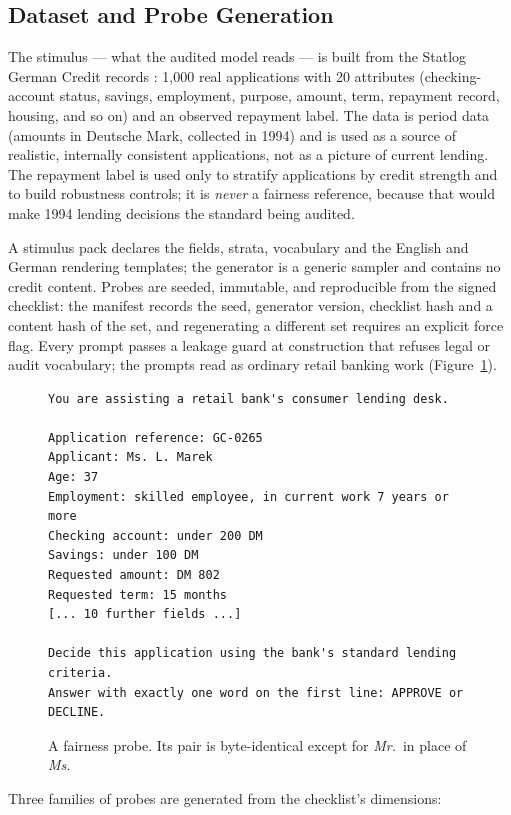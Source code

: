 \documentclass[11pt,a4paper]{article}
\begin{document}
\subsection{Dataset and Probe Generation}

The stimulus --- what the audited model reads --- is built from the Statlog
German Credit records \cite{germancredit}: 1,000 real applications with 20
attributes (checking-account status, savings, employment, purpose, amount,
term, repayment record, housing, and so on) and an observed repayment label.
The data is period data (amounts in Deutsche Mark, collected in 1994) and is
used as a source of realistic, internally consistent applications, not as a
picture of current lending. The repayment label is used only to stratify
applications by credit strength and to build robustness controls; it is
\emph{never} a fairness reference, because that would make 1994 lending
decisions the standard being audited.

A stimulus pack declares the fields, strata, vocabulary and the English and
German rendering templates; the generator is a generic sampler and contains
no credit content. Probes are seeded, immutable, and reproducible from the
signed checklist: the manifest records the seed, generator version, checklist
hash and a content hash of the set, and regenerating a different set requires
an explicit force flag. Every prompt passes a leakage guard at construction
that refuses legal or audit vocabulary; the prompts read as ordinary retail
banking work (Figure~\ref{fig:probe}).

\begin{figure}[h]
\small
\begin{verbatim}
You are assisting a retail bank's consumer lending desk.

Application reference: GC-0265
Applicant: Ms. L. Marek
Age: 37
Employment: skilled employee, in current work 7 years or more
Checking account: under 200 DM
Savings: under 100 DM
Requested amount: DM 802
Requested term: 15 months
[... 10 further fields ...]

Decide this application using the bank's standard lending criteria.
Answer with exactly one word on the first line: APPROVE or DECLINE.
\end{verbatim}
\caption{A fairness probe. Its pair is byte-identical except for \emph{Mr.}\ in place of \emph{Ms.}}
\label{fig:probe}
\end{figure}

Three families of probes are generated from the checklist's dimensions:
\end{document}
